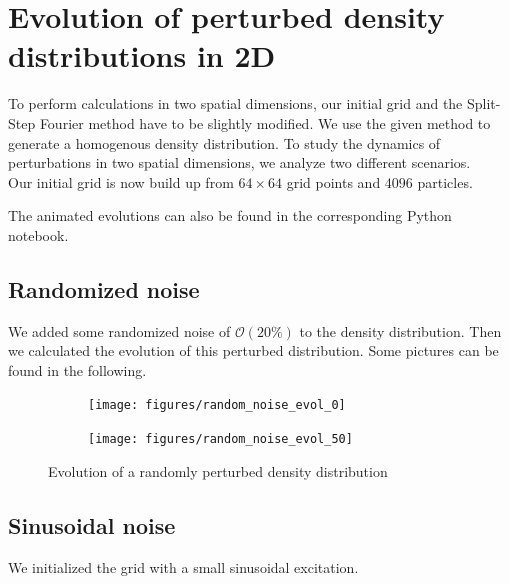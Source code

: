  \section{Evolution of perturbed density distributions in 2D}
To perform calculations in two spatial dimensions, our initial grid and the Split-Step Fourier method have to be slightly modified. We use the given method to generate a homogenous density distribution. To study the dynamics of perturbations in two spatial dimensions, we analyze two different scenarios. \\ 
Our initial grid is now build up from $64\times 64$ grid points and $4096$ particles. 

The animated evolutions can also be found in the corresponding Python notebook.
\subsection{Randomized noise}
 We added some randomized noise of $\mathcal{O}(20\%)$ to the density distribution. Then we calculated the evolution of this perturbed distribution. Some pictures can be found in the following. 
 
 \begin{figure}[H]
 \centering
 \begin{subfigure}{0.42\textwidth} 
 	\texttt{[image: figures/random\_noise\_evol\_0]}
 \end{subfigure}
 \begin{subfigure}{0.42\textwidth} 
 	\texttt{[image: figures/random\_noise\_evol\_50]}
 \end{subfigure}
 
 \caption{Evolution of a randomly perturbed density distribution}	
 \end{figure}

 
 \subsection{Sinusoidal noise}
  We initialized the grid with a small sinusoidal excitation. 
  
